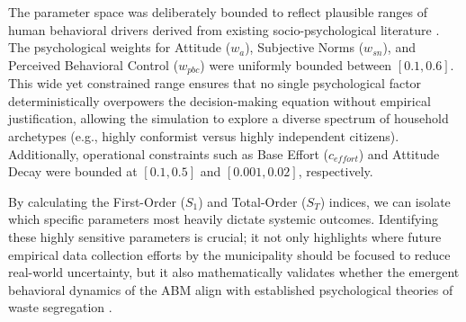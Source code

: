 The parameter space was deliberately bounded to reflect plausible ranges of human behavioral drivers derived from existing socio-psychological literature \citep{Meng2018}. The psychological weights for Attitude ($w_a$), Subjective Norms ($w_{sn}$), and Perceived Behavioral Control ($w_{pbc}$) were uniformly bounded between $[0.1, 0.6]$. This wide yet constrained range ensures that no single psychological factor deterministically overpowers the decision-making equation without empirical justification, allowing the simulation to explore a diverse spectrum of household archetypes (e.g., highly conformist versus highly independent citizens). Additionally, operational constraints such as Base Effort ($c_{effort}$) and Attitude Decay were bounded at $[0.1, 0.5]$ and $[0.001, 0.02]$, respectively. 

By calculating the First-Order ($S_1$) and Total-Order ($S_T$) indices, we can isolate which specific parameters most heavily dictate systemic outcomes. Identifying these highly sensitive parameters is crucial; it not only highlights where future empirical data collection efforts by the municipality should be focused to reduce real-world uncertainty, but it also mathematically validates whether the emergent behavioral dynamics of the ABM align with established psychological theories of waste segregation \citep{TianReview2024}.